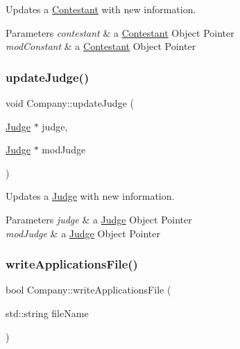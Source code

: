Updates a \hyperlink{class_contestant}{Contestant} with new information. 


\begin{DoxyParams}{Parameters}
{\em contestant} & a \hyperlink{class_contestant}{Contestant} Object Pointer \\
\hline
{\em mod\+Constant} & a \hyperlink{class_contestant}{Contestant} Object Pointer \\
\hline
\end{DoxyParams}
\mbox{\label{class_company_a315bc334167bce6e6836b6462f85e959}} 
\subsubsection{\texorpdfstring{update\+Judge()}{updateJudge()}}
{\footnotesize\ttfamily void Company\+::update\+Judge (\begin{DoxyParamCaption}\item[{\hyperlink{class_judge}{Judge} $\ast$}]{judge,  }\item[{\hyperlink{class_judge}{Judge} $\ast$}]{mod\+Judge }\end{DoxyParamCaption})}



Updates a \hyperlink{class_judge}{Judge} with new information. 


\begin{DoxyParams}{Parameters}
{\em judge} & a \hyperlink{class_judge}{Judge} Object Pointer \\
\hline
{\em mod\+Judge} & a \hyperlink{class_judge}{Judge} Object Pointer \\
\hline
\end{DoxyParams}
\mbox{\label{class_company_a4bdd95cb403430ae299259ac26721dde}} 
\subsubsection{\texorpdfstring{write\+Applications\+File()}{writeApplicationsFile()}}
{\footnotesize\ttfamily bool Company\+::write\+Applications\+File (\begin{DoxyParamCaption}\item[{std\+::string}]{file\+Name }\end{DoxyParamCaption})}



